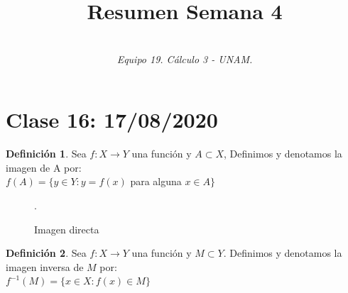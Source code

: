 \documentclass[secnumarabic,balancelastpage,amsmath,amssymb]{article}
\theoremstyle{remark}
\theoremstyle{definition}
\newtheorem{definition}{Definición}[section]
\theoremstyle{prop}
\begin{document}
\title{\vspace{-15mm}\textbf{Resumen Semana 4}}
\author{\\ \emph{Equipo 19. Cálculo 3 - UNAM.}}


\maketitle
\section{Clase 16: 17/08/2020 }
\begin{definition}{Sea $f:X\rightarrow Y$ una función y $A\subset X$, Definimos y denotamos la imagen de A por:\\ 
$f(A)=\{ y \in Y :y=f(x)$ para alguna $x \in A\}$ }
\end{definition}

\begin{figure}[h!]
\centering.
\caption{Imagen directa}
\end{figure}





\begin{definition}{ Sea $f:X\rightarrow Y$ una función y $M \subset Y.$ Definimos y denotamos la imagen inversa de $M$ por: \\
$f^{-1}(M)= \{x \in X:f(x) \in M\}$}\end{definition}
\end{document}
